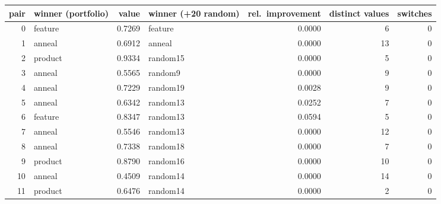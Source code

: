 \begin{tabular}{rlrlrrr}
\toprule
pair & winner (portfolio) & value & winner (+20 random) & rel.\ improvement & distinct values & switches\\
\midrule
0 & feature & 0.7269 & feature & 0.0000 & 6 & 0\\
1 & anneal & 0.6912 & anneal & 0.0000 & 13 & 0\\
2 & product & 0.9334 & random15 & 0.0000 & 5 & 0\\
3 & anneal & 0.5565 & random9 & 0.0000 & 9 & 0\\
4 & anneal & 0.7229 & random19 & 0.0028 & 9 & 0\\
5 & anneal & 0.6342 & random13 & 0.0252 & 7 & 0\\
6 & feature & 0.8347 & random13 & 0.0594 & 5 & 0\\
7 & anneal & 0.5546 & random13 & 0.0000 & 12 & 0\\
8 & anneal & 0.7338 & random18 & 0.0000 & 7 & 0\\
9 & product & 0.8790 & random16 & 0.0000 & 10 & 0\\
10 & anneal & 0.4509 & random14 & 0.0000 & 14 & 0\\
11 & product & 0.6476 & random14 & 0.0000 & 2 & 0\\
\bottomrule
\end{tabular}
